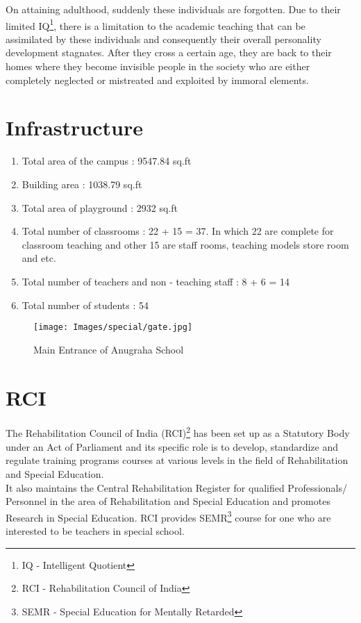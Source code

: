 On attaining adulthood, suddenly these individuals are forgotten. Due to their limited IQ\footnote{IQ - Intelligent Quotient}, there is a limitation to the academic teaching that can be assimilated by these individuals and consequently their overall personality development stagnates. After they cross a certain age, they are back to their homes where they become invisible people in the society who are either completely neglected or mistreated and exploited by immoral elements.

\section{Infrastructure}
\begin{enumerate}
    \item Total area of the campus : 9547.84 sq.ft
    \item Building area : 1038.79 sq.ft
    \item Total area of playground : 2932 sq.ft
    \item Total number of classrooms : 22 + 15 = 37. In which 22 are complete for classroom teaching and other 15 are staff rooms, teaching models store room and etc.
    \item Total number of teachers and non - teaching staff : 8 + 6 = 14
    \item Total number of students : 54
\end{enumerate}

\begin{figure}[H]
    \centering
    \texttt{[image: Images/special/gate.jpg]}
    \caption*{Main Entrance of Anugraha School}
\end{figure}

\section{RCI}
The Rehabilitation Council of India (RCI)\footnote{RCI - Rehabilitation Council of India} has been set up as a Statutory Body under an Act of Parliament and its specific role is to develop, standardize and regulate training programs courses at various levels in the field of Rehabilitation and Special Education.\\ 

It also maintains the Central Rehabilitation Register for qualified Professionals/ Personnel in the area of Rehabilitation and Special Education and promotes Research in Special Education. RCI provides SEMR\footnote{SEMR - Special Education for Mentally Retarded} course for one who are interested to be teachers in special school.


